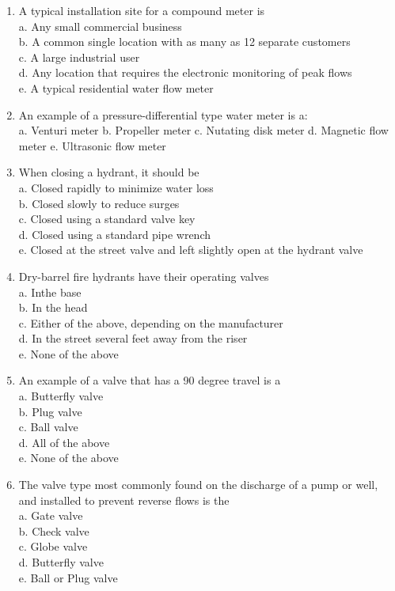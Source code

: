 \begin{enumerate}[1.]
\item A typical installation site for a compound meter is\\
a. Any small commercial business\\
b. A common single location with as many as 12 separate customers\\
c. A large industrial user\\
d. Any location that requires the electronic monitoring of peak flows\\
e. A typical residential water flow meter\\

\item An example of a pressure-differential type water meter is a:\\
a. Venturi meter
b. Propeller meter
c. Nutating disk meter
d. Magnetic flow meter
e. Ultrasonic flow meter

\item When closing a hydrant, it should be\\
a. Closed rapidly to minimize water loss\\
b. Closed slowly to reduce surges\\
c. Closed using a standard valve key\\
d. Closed using a standard pipe wrench\\
e. Closed at the street valve and left slightly open at the hydrant valve\\

\item Dry-barrel fire hydrants have their operating valves\\
a. Inthe base\\
b. In the head\\
c. Either of the above, depending on the manufacturer\\
d. In the street several feet away from the riser\\
e. None of the above\\

\item An example of a valve that has a 90 degree travel is a\\
a. Butterfly valve\\
b. Plug valve\\
c. Ball valve\\
d. All of the above\\
e. None of the above

\item The valve type most commonly found on the discharge of a pump or well, and installed to prevent reverse flows is the\\
a. Gate valve\\
b. Check valve\\
c. Globe valve\\
d. Butterfly valve\\
e. Ball or Plug valve\\



\end{enumerate}

